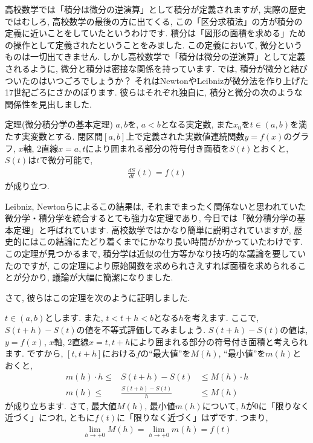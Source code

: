 \par 高校数学では「積分は微分の逆演算」として積分が定義されますが, 実際の歴史ではむしろ, 高校数学の最後の方に出てくる, この「区分求積法」の方が積分の定義に近いことをしていたというわけです. 
積分は「図形の面積を求める」ための操作として定義されたということをみました. この定義において, 微分というものは一切出てきません. しかし高校数学で「積分は微分の逆演算」として定義されるように, 微分と積分は密接な関係を持っています. では, 積分が微分と結びついたのはいつごろでしょうか？ それはNewtonやLeibnizが微分法を作り上げた17世紀ごろにさかのぼります. 彼らはそれぞれ独自に, 積分と微分の次のような関係性を見出しました. 
\begin{itembox}[l]{定理(微分積分学の基本定理)}
$a,b$を, $a<b$となる実定数, また$x_0$を$t\in (a,b)$を満たす実変数とする. 閉区間$[a,b]$上で定義された実数値連続関数$y=f(x)$のグラフ, $x$軸, 2直線$x=a,t$により囲まれる部分の符号付き面積を$S(t)$とおくと, $S(t)$は$t$で微分可能で, 
\begin{eqnarray}
\frac{dS}{dt}(t)=f(t) \nonumber
\end{eqnarray}
が成り立つ. 
\end{itembox}
\par Leibniz, Newtonらによるこの結果は, それまでまったく関係ないと思われていた微分学・積分学を統合するとても強力な定理であり, 今日では「微分積分学の基本定理」と呼ばれています. 高校数学ではかなり簡単に説明されていますが, 歴史的にはこの結論にたどり着くまでにかなり長い時間がかかっていたわけです. この定理が見つかるまで, 積分学は近似の仕方等かなり技巧的な議論を要していたのですが, この定理により原始関数を求められさえすれば面積を求められることが分かり, 議論が大幅に簡潔になりました. 
\par さて, 彼らはこの定理を次のように証明しました. 
\par $t\in(a,b)$とします. また, $t<t+h<b$となる$h$を考えます. ここで, $S(t+h)-S(t)$の値を不等式評価してみましょう. $S(t+h)-S(t)$の値は, $y=f(x)$, $x$軸, 2直線$x=t,t+h$により囲まれる部分の符号付き面積と考えられます. ですから, $[t,t+h]$における$f$の“最大値”を$M(h)$, “最小値”を$m(h)$とおくと, 
\begin{eqnarray}
m(h) \cdot h \le & S(t+h)-S(t) & \le M(h) \cdot h \nonumber \\
m(h) \le & \frac{S(t+h)-S(t)}{h} & \le M(h) \nonumber
\end{eqnarray}
が成り立ちます. さて, 最大値$M(h)$, 最小値$m(h)$について, $h$が0に「限りなく近づく」につれ, ともに$f(t)$に「限りなく近づく」はずです. つまり, 
\begin{eqnarray}
\lim_{h \to +0}M(h)=\lim_{h \to +0}m(h)=f(t) \nonumber
\end{eqnarray}
